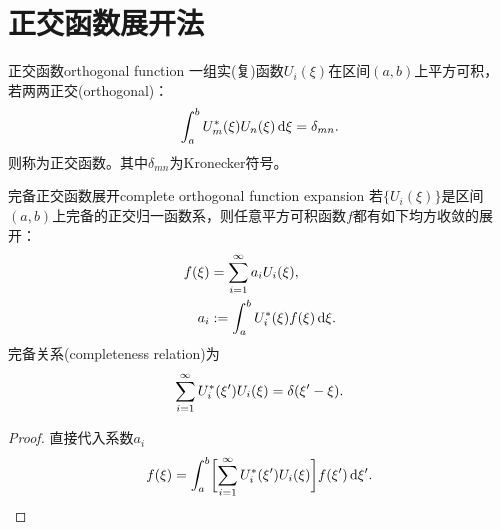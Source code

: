 \section{正交函数展开法}
\label{sec:orthogonal functions and expansions}


\begin{definition}{正交函数}{orthogonal function}
    一组实(复)函数$U_i(\xi)$在区间$(a,b)$上平方可积，若两两正交(orthogonal)：
    \begin{equation}
        \int_a^bU_m^\ast(\xi)U_n(\xi)\mathop{}\!\mathrm{d}\xi = \delta_{mn}.
    \end{equation}
    则称为正交函数。其中$\delta_{mn}$为Kronecker符号。
\end{definition}

\begin{theorem}
    {完备正交函数展开}{complete orthogonal function expansion}
    若$\{U_i(\xi)\}$是区间$(a,b)$上完备的正交归一函数系，则任意平方可积函数$f$都有如下均方收敛的展开：
    \begin{subequations}
        \label{eq:ed-orthonormal-expansion}
        \begin{align}
            f(\xi) &= \sum_{i=1}^\infty a_iU_i(\xi),\\
            a_i &:= \int_a^bU_i^\ast(\xi)f(\xi)\mathop{}\!\mathrm{d}\xi.
        \end{align}
    \end{subequations}
    完备关系(completeness relation)为
    \begin{equation}
        \sum_{i=1}^\infty U_i^\ast(\xi')U_i(\xi) = \delta(\xi' - \xi).
    \end{equation}
\end{theorem}

\begin{proof}
    直接代入系数$a_i$
    \[
        f(\xi) = \int_a^b\biggl[\sum_{i=1}^\infty U_i^\ast(\xi')U_i(\xi)\biggr]f(\xi')\mathop{}\!\mathrm{d}\xi'.
        \qedhere
    \]
\end{proof}

